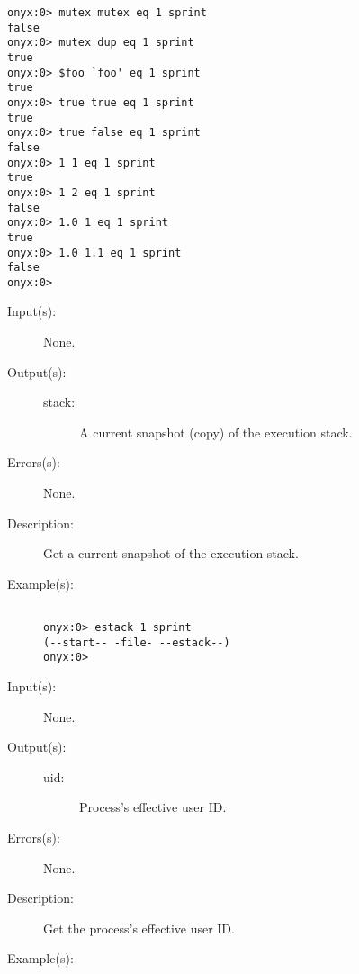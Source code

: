 \begin{description}
\begin{description}
\begin{verbatim}
onyx:0> mutex mutex eq 1 sprint
false
onyx:0> mutex dup eq 1 sprint
true
onyx:0> $foo `foo' eq 1 sprint
true
onyx:0> true true eq 1 sprint
true
onyx:0> true false eq 1 sprint
false
onyx:0> 1 1 eq 1 sprint
true
onyx:0> 1 2 eq 1 sprint
false
onyx:0> 1.0 1 eq 1 sprint
true
onyx:0> 1.0 1.1 eq 1 sprint
false
onyx:0>
		\end{verbatim}
	\end{description}
\label{systemdict:estack}
\item[{\onyxop{--}{estack}{stack}}: ]
	\begin{description}\item[]
	\item[Input(s): ] None.
	\item[Output(s): ]
		\begin{description}\item[]
		\item[stack: ]
			A current snapshot (copy) of the execution stack.
		\end{description}
	\item[Errors(s): ] None.
	\item[Description: ]
		Get a current snapshot of the execution stack.
	\item[Example(s): ]\begin{verbatim}

onyx:0> estack 1 sprint
(--start-- -file- --estack--)
onyx:0>
		\end{verbatim}
	\end{description}
\label{systemdict:euid}
\item[{\onyxop{--}{euid}{uid}}: ]
	\begin{description}\item[]
	\item[Input(s): ] None.
	\item[Output(s): ]
		\begin{description}\item[]
		\item[uid: ]
			Process's effective user ID.
		\end{description}
	\item[Errors(s): ] None.
	\item[Description: ]
		Get the process's effective user ID.
	\item[Example(s): ]\begin{verbatim}


\end{verbatim}
\end{description}
\end{description}
